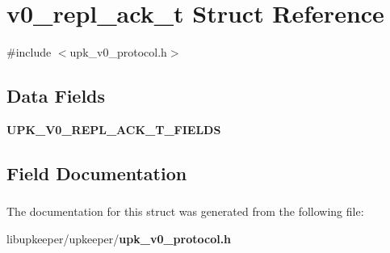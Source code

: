 \section{v0\_\-repl\_\-ack\_\-t Struct Reference}
\label{structv0__repl__ack__t}


{\ttfamily \#include $<$upk\_\-v0\_\-protocol.h$>$}

\subsection*{Data Fields}
\begin{DoxyCompactItemize}
\item 
{\bf UPK\_\-V0\_\-REPL\_\-ACK\_\-T\_\-FIELDS}
\end{DoxyCompactItemize}


\subsection{Field Documentation}
\subsubsection[{UPK\_\-V0\_\-REPL\_\-ACK\_\-T\_\-FIELDS}]{}\label{structv0__repl__ack__t_a4e10398e36bbb6f9757f846749796eee}


The documentation for this struct was generated from the following file:\begin{DoxyCompactItemize}
\item 
libupkeeper/upkeeper/{\bf upk\_\-v0\_\-protocol.h}\end{DoxyCompactItemize}
